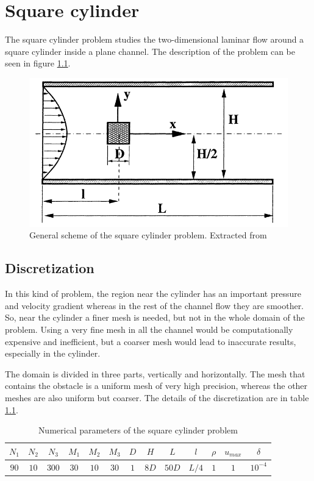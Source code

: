 \chapter{Square cylinder}
The square cylinder problem studies the two-dimensional laminar flow around a square cylinder inside a plane channel. The description of the problem can be seen in figure \ref{SchemeSquareProblem}.
\begin{figure}[h]
	\centering
	\includegraphics[scale=0.5]{Square/Definition}
	\caption[General scheme of the square cylinder problem]{General scheme of the square cylinder problem. Extracted from \cite{Breuer2000}}
	\label{SchemeSquareProblem}
\end{figure}

\section{Discretization}
In this kind of problem, the region near the cylinder has an important pressure and velocity gradient whereas in the rest of the channel flow they are smoother. So, near the cylinder a finer mesh is needed, but not in the whole domain of the problem. Using a very fine mesh in all the channel would be computationally expensive and inefficient, but a coarser mesh would lead to inaccurate results, especially in the cylinder.

The domain is divided in three parts, vertically and horizontally. The mesh that contains the obstacle is a uniform mesh of very high precision, whereas the other meshes are also uniform but coarser. The details of the discretization are in table \ref{NumericalCylinder}.
\begin{table}[h]
	\centering
	\begin{tabular}{ |c|c|c|c|c|c|c|c|c|c|c|c|c| }
		\hline
		$N_{1}$ & $N_{2}$ & $N_{3}$ & $M_{1}$ & $M_{2}$ & $M_{3}$ & $D$ & $H$ & $L$ & $l$ & $\rho$ & $u_{max}$ & $\delta$ \\ \hline
		$90$ & $10$ & $300$ & $30$ & $10$ & $30$ & $1$ & $8D$ & $50D$ & $L/4$ & $1$ & $1$ & $10^{-4}$ \\ \hline
	\end{tabular}
\caption{Numerical parameters of the square cylinder problem}
\label{NumericalCylinder}
\end{table}


